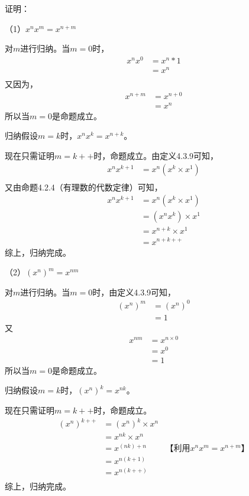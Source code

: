 \documentclass{article}
\theoremstyle{mystyle}
\begin{document}
证明：

（1）$x^n x^m = x^{n+m}$

对$m$进行归纳。当$m=0$时，
\begin{align*}
  x^n x^0 & = x^n * 1 \\
          & = x^n     \\
\end{align*}
又因为，
\begin{align*}
  x^{n+m} & = x^{n+0} \\
          & = x^n
\end{align*}
所以当$m=0$是命题成立。

归纳假设$m=k$时，$x^n x^k = x^{n+k}$。

现在只需证明$m=k++$时，命题成立。由定义4.3.9可知，
\begin{align*}
  x^n x^{k+1} & = x^n (x^k \times x^1) \\
\end{align*}
又由命题4.2.4（有理数的代数定律）可知，
\begin{align*}
  x^n x^{k+1} & = x^n (x^k \times x^1) \\
              & = (x^n x^k) \times x^1 \\
              & = x^{n+k} \times x^1   \\
              & = x^{n+k++}
\end{align*}
综上，归纳完成。

（2）$(x^n)^m = x^{nm}$

对$m$进行归纳。当$m=0时$，由定义4.3.9可知，
\begin{align*}
  (x^n)^m & = (x^n)^0 \\
          & = 1
\end{align*}
又
\begin{align*}
  x^{nm} & = x^{n \times 0} \\
         & = x^0            \\
         & = 1
\end{align*}
所以当$m=0$是命题成立。

归纳假设$m=k$时，$(x^n)^k = x^{nk}$。

现在只需证明$m=k++$时，命题成立。
\begin{align*}
  (x^n)^{k++} & = (x^n)^k \times x^n                                  \\
              & = x^{nk} \times x^n                                   \\
              & = x^{(nk) + n}       & \text{【利用$x^n x^m = x^{n+m}$】} \\
              & = x^{n(k+1)}                                          \\
              & = x^{n(k++)}                                          \\
\end{align*}
综上，归纳完成。
\end{document}
